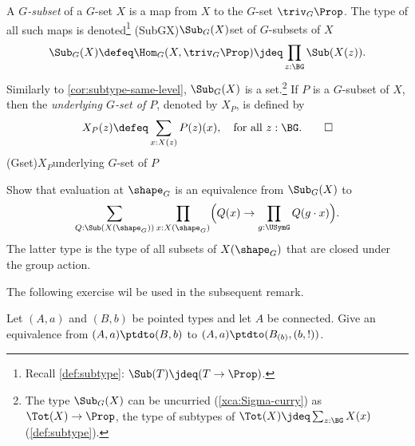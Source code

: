 \begin{definition}\label{def:Gsubset}
  A \emph{$G$-subset} of a $G$-set $X$ is a map from $X$ to the $G$-set 
  $\triv_G\Prop$. 
  The type of all such maps is denoted\footnote{%
  Recall \cref{def:subtype}: $\Sub(T)\jdeq(T\to\Prop)$.}
  \glossary(SubGX){$\protect\Sub_G(X)$}{set of $G$-subsets of $X$}
  \[
   \Sub_G(X)\defeq \Hom_G(X,\triv_G\Prop) 
   \jdeq \prod_{z:\BG}\Sub(X(z)).
  \]
  Similarly to \cref{cor:subtype-same-level}, $\Sub_{G}(X)$ is a set.\footnote{%
  \label{ft:SubTotX} The type $\Sub_{G}(X)$ can be uncurried 
  (\cref{xca:Sigma-curry}) as $\Tot(X)\to\Prop$, 
  the type of subtypes of $\Tot(X)\jdeq\sum_{z:\BG}X(x)$ (\cref{def:subtype}).}
  If $P$ is a $G$-subset of $X$, then the \emph{underlying $G$-set of $P$},
  denoted by $X_P$, is defined by
  \[
  X_P(z) \defeq \sum_{x:X(z)}P(z)(x),\quad\text{for all $z:\BG$}.\qedhere
  \]
  \glossary(Gset){$X_P$}{underlying $G$-set of $P$}
\end{definition}

\begin{xca}\label{xca:SubGX-closedSubXshG}
Show that evaluation at $\sh_G$ is an equivalence from $\Sub_G(X)$ to
\[
  \sum_{Q:\Sub(X(\sh_G))}
  \prod_{x:X(\sh_G)}
  \Bigl(Q(x)\to\prod_{g:\USymG} Q(g\cdot x)\Bigr).
\]
The latter type is the type of all subsets of $X(\sh_G)$ that are closed under
the group action.
\end{xca}

The following exercise wil be used in the subsequent remark.
\begin{xca}\label{xca:ptd-conn-to-comp}
Let $(A,a)$ and $(B,b)$ be pointed types and let $A$ be connected.
Give an equivalence from $(A,a)\ptdto(B,b)$ to
$(A,a)\ptdto(B_{(b)},(b,!))$.
\end{xca}

